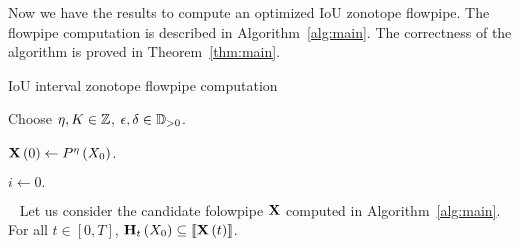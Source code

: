 Now we have the results to compute an optimized IoU zonotope flowpipe.
The flowpipe computation is described in Algorithm~\ref{alg:main}.
The correctness of the algorithm is proved in Theorem~\ref{thm:main}.
%
\begin{algorithm}\caption{IoU interval zonotope
flowpipe computation}\label{alg:main}


Choose $\eta,K\in\mathbb{Z}$, $\epsilon,\delta\in\mathbb{D}_{>0}$.

$\mathbf{X}\left(0\right)\gets P^{\eta}\left(X_0\right)$.

$i\gets 0.$

\end{algorithm}
%
\begin{theorem}~\label{thm:main}
Let us consider the candidate folowpipe $\mathbf{X}$ computed in
Algorithm~\ref{alg:main}.  For all $t\in[0,T]$,
$\mathbf{H}_{t}\left(X_0\right)\subseteq \left\llbracket{\mathbf{X}\left(t\right)}\right\rrbracket$.
\end{theorem}
%
